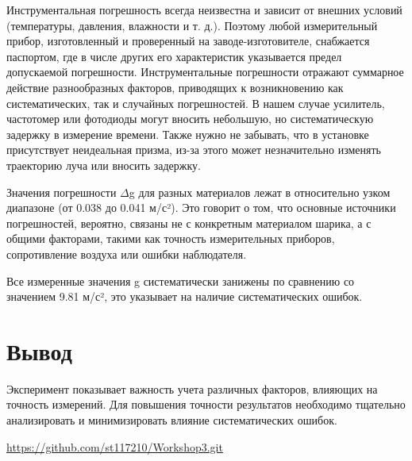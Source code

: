 Инструментальная погрешность всегда неизвестна и зависит от внешних условий (температуры, давления, влажности и т. д.). Поэтому любой измерительный прибор, изготовленный и проверенный на заводе-изготовителе, снабжается паспортом, где в числе других
его характеристик указывается предел допускаемой погрешности. Инструментальные погрешности отражают суммарное действие разнообразных факторов, приводящих к возникновению как систематических, так и случайных погрешностей. В нашем случае усилитель, частотомер или фотодиоды могут вносить небольшую, но систематическую задержку в измерение времени. Также нужно не забывать, что в установке присутствует неидеальная призма, из-за этого может незначительно изменять траекторию луча или вносить задержку.

Значения погрешности $\Delta$g для разных материалов лежат в относительно узком диапазоне (от 0.038 до 0.041 м/с²). Это говорит о том, что основные источники погрешностей, вероятно, связаны не с конкретным материалом шарика, а с общими факторами, такими как точность измерительных приборов, сопротивление воздуха или ошибки наблюдателя.

Все измеренные значения g систематически занижены по сравнению со значением 9.81 м/с², это указывает на наличие систематических ошибок.

\section{Вывод}
Эксперимент показывает важность учета различных факторов, влияющих на точность измерений. Для повышения точности результатов необходимо тщательно анализировать и минимизировать влияние систематических ошибок.
\begin{thebibliography}{9}

\url{https://github.com/st117210/Workshop3.git}  

\end{thebibliography}
\clearpage
\appendix